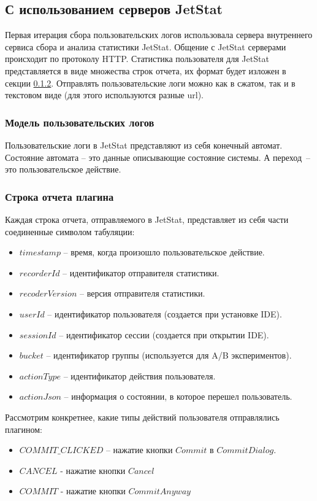 \documentclass[times]{itmo-student-thesis}
\begin{document}
\subsection{С использованием серверов JetStat}
Первая итерация сбора пользовательских логов использовала сервера внутреннего сервиса сбора и анализа статистики JetStat. Общение с JetStat серверами происходит по протоколу HTTP. Статистика пользователя для JetStat представляется в виде множества строк отчета, их формат будет изложен в секции \ref{report-line}. Отправлять пользовательские логи можно как в сжатом, так и в текстовом виде (для этого используются разные url).
\subsubsection{Модель пользовательских логов}
Пользовательские логи в JetStat представляют из себя конечный автомат. Состояние автомата -- это данные описывающие состояние системы. А переход~-- это пользовательское действие.
\subsubsection{Строка отчета плагина}\label{report-line}
Каждая строка отчета, отправляемого в JetStat, представляет из себя части соединенные символом табуляции:
    \begin{itemize}[label={\textbullet}]
        \item $timestamp$ -- время, когда произошло пользовательское действие.
        \item $recorderId$ -- идентификатор отправителя статистики.
        \item $recoderVersion$ -- версия отправителя статистики.
        \item $userId$ -- идентификатор пользователя (создается при установке IDE).
        \item $sessionId$ -- идентификатор сессии (создается при открытии IDE).
        \item $bucket$ -- идентификатор группы (используется для A/B экспериментов).
        \item $actionType$ -- идентификатор действия пользователя.
        \item $actionJson$ -- информация о состоянии, в которое перешел пользователь.
    \end{itemize}

Рассмотрим конкретнее, какие типы действий пользователя отправлялись плагином:
    \begin{itemize}[label={\textbullet}]
        \item $COMMIT\_CLICKED$ -- нажатие кнопки $Commit$ в $Commit Dialog$.
        \item $CANCEL$ - нажатие кнопки $Cancel$
        \item $COMMIT$ - нажатие кнопки $Commit Anyway$
    \end{itemize}
\end{document}
